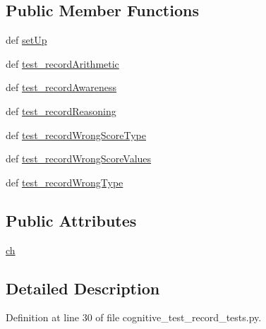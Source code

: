 \subsection*{Public Member Functions}
\begin{DoxyCompactItemize}
\item 
def \hyperlink{classcognitive__test__record__tests_1_1CognitiveTestRecordTests_afe75286872b43807a3d3d57ed50b3943}{set\-Up}
\item 
def \hyperlink{classcognitive__test__record__tests_1_1CognitiveTestRecordTests_a86f05ef4d1222745cb12d4c96a06a89c}{test\-\_\-record\-Arithmetic}
\item 
def \hyperlink{classcognitive__test__record__tests_1_1CognitiveTestRecordTests_ad6a7bdabbf572a07f58318c70c22b920}{test\-\_\-record\-Awareness}
\item 
def \hyperlink{classcognitive__test__record__tests_1_1CognitiveTestRecordTests_a908f74cc1661eb7af9b21bf08f5a17ee}{test\-\_\-record\-Reasoning}
\item 
def \hyperlink{classcognitive__test__record__tests_1_1CognitiveTestRecordTests_a70222f29f88b0b495af82b6ae74952bb}{test\-\_\-record\-Wrong\-Score\-Type}
\item 
def \hyperlink{classcognitive__test__record__tests_1_1CognitiveTestRecordTests_a4918c625416335d46b4a30fc1a7f1607}{test\-\_\-record\-Wrong\-Score\-Values}
\item 
def \hyperlink{classcognitive__test__record__tests_1_1CognitiveTestRecordTests_a6e72ddd1a185ec68f56510d2e82df21b}{test\-\_\-record\-Wrong\-Type}
\end{DoxyCompactItemize}
\subsection*{Public Attributes}
\begin{DoxyCompactItemize}
\item 
\hyperlink{classcognitive__test__record__tests_1_1CognitiveTestRecordTests_aa06dc6e098f74557f3ec0c1a919e2028}{ch}
\end{DoxyCompactItemize}


\subsection{Detailed Description}


Definition at line 30 of file cognitive\-\_\-test\-\_\-record\-\_\-tests.\-py.



